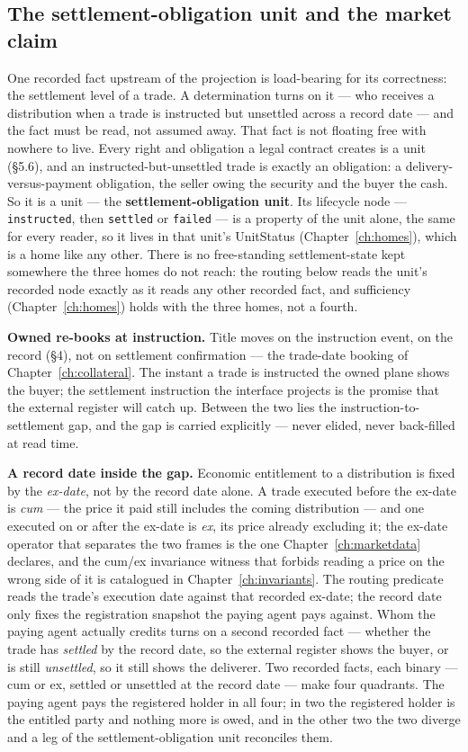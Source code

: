 \subsection{The settlement-obligation unit and the market claim}

One recorded fact upstream of the projection is load-bearing for its correctness:
the settlement level of a trade. A determination turns on it --- who receives a
distribution when a trade is instructed but unsettled across a record date --- and
the fact must be read, not assumed away. That fact is not floating free with nowhere
to live. Every right and obligation a legal contract creates is a unit (\S5.6), and an
instructed-but-unsettled trade is exactly an obligation: a delivery-versus-payment
obligation, the seller owing the security and the buyer the cash. So it is a unit ---
the \textbf{settlement-obligation unit}. Its lifecycle node --- \texttt{instructed},
then \texttt{settled} or \texttt{failed} --- is a property of the unit alone, the same
for every reader, so it lives in that unit's UnitStatus (Chapter~\ref{ch:homes}), which
is a home like any other. There is no free-standing settlement-state kept somewhere the
three homes do not reach: the routing below reads the unit's recorded node exactly as it
reads any other recorded fact, and sufficiency (Chapter~\ref{ch:homes}) holds with the
three homes, not a fourth.

\medskip\noindent\textbf{Owned re-books at instruction.} Title moves on the
instruction event, on the record (\S4), not on settlement confirmation --- the
trade-date booking of Chapter~\ref{ch:collateral}. The instant a trade is
instructed the owned plane shows the buyer; the settlement instruction the
interface projects is the promise that the external register will catch up. Between
the two lies the instruction-to-settlement gap, and the gap is carried explicitly
--- never elided, never back-filled at read time.

\medskip\noindent\textbf{A record date inside the gap.} Economic entitlement to a
distribution is fixed by the \emph{ex-date}, not by the record date alone. A trade
executed before the ex-date is \emph{cum} --- the price it paid still includes the
coming distribution --- and one executed on or after the ex-date is \emph{ex}, its
price already excluding it; the ex-date operator that separates the two frames is the
one Chapter~\ref{ch:marketdata} declares, and the cum/ex invariance witness that
forbids reading a price on the wrong side of it is catalogued in
Chapter~\ref{ch:invariants}. The routing predicate reads the trade's execution date
against that recorded ex-date; the record date only fixes the registration snapshot
the paying agent pays against. Whom the paying agent actually credits turns on a second
recorded fact --- whether the trade has \emph{settled} by the record date, so the
external register shows the buyer, or is still \emph{unsettled}, so it still shows the
deliverer. Two recorded facts, each binary --- cum or ex, settled or unsettled at the
record date --- make four quadrants. The paying agent pays the registered holder in
all four; in two the registered holder is the entitled party and nothing more is owed,
and in the other two the two diverge and a leg of the settlement-obligation unit
reconciles them.

